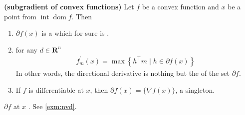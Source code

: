 \documentclass{article}
\newcommand{\bfs}[1]{\textbf{({#1}) }}
\newcommand{\inte}{\operatorname{int}}
\newcommand{\dom}{\operatorname{dom}}
\begin{document}
\begin{thma}\bfs{subgradient of convex functions}\label{thm:sub_convxf}
Let $f$ be a convex function and $x$ be a point from $\inte \dom f$. Then
\begin{enumerate}[1).]
    \item $\partial f(x)$ is a  which for sure is .
    \item for any $d \in \mathbf{R}^{n}$
\begin{align}
f_{m}^{\prime}(x)=\max \left\{h^{\top} m \mid h\in \partial f(x)\right\}\label{eq:sub_fff}
\end{align}
In other words, the directional derivative is nothing but the  of the set $\partial f$.
\item If $f$ is differentiable at $x$, then $\partial f(x)=\{\nabla f(x)\}$, a singleton.
\end{enumerate} 
\end{thma}
\begin{rema}
$\partial f$ at $x$ . See \cref{exm:nvd}.
\end{rema}
\end{document}
